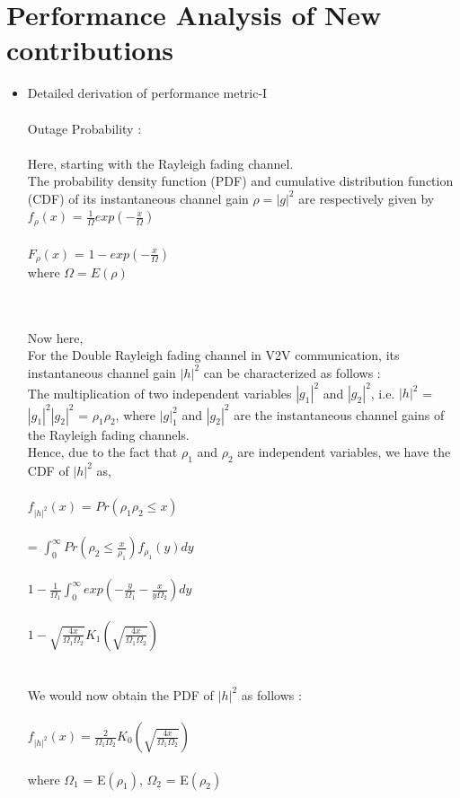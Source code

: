 \documentclass{article}
\begin{document}
\section {Performance Analysis of New contributions}
\begin{itemize}

\item Detailed derivation of performance metric-I
\\\\Outage Probability :
\\\\Here, starting with the Rayleigh fading channel.
\\The probability density function (PDF) and cumulative distribution function
(CDF) of its instantaneous channel gain $\rho = |g|^{2}$ are respectively
given by $f_{\rho}(x)$ = $\frac{1}{\Omega} exp (-\frac{x}{\Omega})$
\\\\$F_{\rho}(x)$ = $1 - exp (-\frac{x}{\Omega})$
\\where $\Omega = E(\rho)$

\\\\Now here,
\\For the Double Rayleigh fading channel in V2V communication, its instantaneous channel gain $|h|^{2}$ can be characterized as follows :
\\The multiplication of two independent variables $|g_{1}|^{2}$ and $|g_{2}|^{2}$, i.e. $|h|^{2}$ = $|g_{1}|^{2} |g_{2}|^{2}$ = $\rho_{1}\rho_{2}$, where $|g|_{1}^{2}$ and $|g_{2}|^{2}$ are the instantaneous channel gains of the Rayleigh fading channels.
\\Hence, due to the fact that $\rho_{1}$ and $\rho_{2}$ are independent variables, we have the CDF of $|h|^{2}$ as,
\\\\$f_{|h|^{2}}(x)$ = $Pr(\rho_{1}\rho_{2}\leq x)$
\\\\ = $\int_{0}^{\infty} Pr(\rho_{2}\leq \frac{x}{\rho_{1}})f_{\rho_{1}}(y)dy$
\\\\$1 - \frac{1}{\Omega_{1}} \int_{0}^{\infty} exp(-\frac{y}{\Omega_{1}}-\frac{x}{y\Omega_{2}})dy$
\\\\$1 - \sqrt{\frac{4x}{\Omega_{1}\Omega_{2}}}K_{1}(\sqrt{\frac{4x}{\Omega_{1}\Omega_{2}}})$\\

\\\\We would now obtain the PDF of $|h|^{2}$ as follows :
\\\\$f_{|h|^{2}}(x) = \frac{2}{\Omega_{1}\Omega_{2}}K_{0}(\sqrt{\frac{4x}{\Omega_{1}\Omega_{2}}})$
\\\\where $\Omega_{1}$ = E$(\rho_{1})$, $\Omega_{2}$ = E$(\rho_{2})$


\end{itemize}
\end{document}
